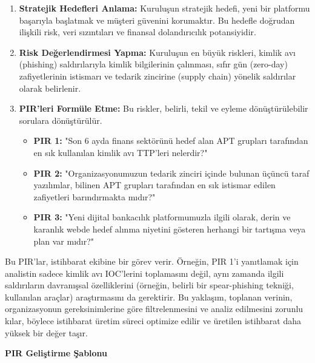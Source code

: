 \begin{enumerate}
    \item \textbf{Stratejik Hedefleri Anlama:} Kuruluşun stratejik hedefi, yeni bir platformu başarıyla başlatmak ve müşteri güvenini korumaktır. Bu hedefle doğrudan ilişkili risk, veri sızıntıları ve finansal dolandırıcılık potansiyidir.
    \item \textbf{Risk Değerlendirmesi Yapma:} Kuruluşun en büyük riskleri, kimlik avı (phishing) saldırılarıyla kimlik bilgilerinin çalınması, sıfır gün (zero-day) zafiyetlerinin istismarı ve tedarik zincirine (supply chain) yönelik saldırılar olarak belirlenir.
    \item \textbf{PIR'leri Formüle Etme:} Bu riskler, belirli, tekil ve eyleme dönüştürülebilir sorulara dönüştürülür.
    \begin{itemize}
        \item \textbf{PIR 1:} "Son 6 ayda finans sektörünü hedef alan APT grupları tarafından en sık kullanılan kimlik avı TTP'leri nelerdir?"
        \item \textbf{PIR 2:} "Organizasyonumuzun tedarik zinciri içinde bulunan üçüncü taraf yazılımlar, bilinen APT grupları tarafından en sık istismar edilen zafiyetleri barındırmakta mıdır?"
        \item \textbf{PIR 3:} "Yeni dijital bankacılık platformumuzla ilgili olarak, derin ve karanlık webde hedef alınma niyetini gösteren herhangi bir tartışma veya plan var mıdır?"
    \end{itemize}
\end{enumerate}

Bu PIR'lar, istihbarat ekibine bir görev verir. Örneğin, PIR 1'i yanıtlamak için analistin sadece kimlik avı IOC'lerini toplamasını değil, aynı zamanda ilgili saldırıların davranışsal özelliklerini (örneğin, belirli bir spear-phishing tekniği, kullanılan araçlar) araştırmasını da gerektirir. Bu yaklaşım, toplanan verinin, organizasyonun gereksinimlerine göre filtrelenmesini ve analiz edilmesini zorunlu kılar, böylece istihbarat üretim süreci optimize edilir ve üretilen istihbarat daha yüksek bir değer taşır.

\textbf{PIR Geliştirme Şablonu}

